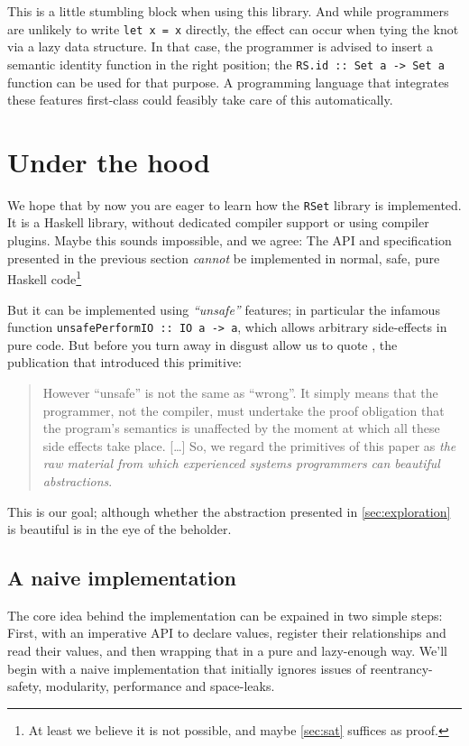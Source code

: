 \documentclass[manuscript,screen,acmsmall]{acmart}
\begin{document}
This is a little stumbling block when using this library. And while programmers are unlikely to write \verb|let x = x| directly, the effect can occur when tying the knot via a lazy data structure. In that case, the programmer is advised to insert a semantic identity function in the right position; the \verb|RS.id :: Set a -> Set a| function can be used for that purpose.
A programming language that integrates these features first-class could feasibly take care of this automatically.

\section{Under the hood}\label{sec:impl}

We hope that by now you are eager to learn how the \verb|RSet| library is implemented. It is a Haskell library, without dedicated compiler support or using compiler plugins. Maybe this sounds impossible, and we agree: The API and specification presented in the previous section \emph{cannot} be implemented in normal, safe, pure Haskell code\footnote{At least we believe it is not possible, and maybe \cref{sec:sat} suffices as proof.}

But it can be implemented using \emph{“unsafe”} features; in particular the infamous function \verb|unsafePerformIO :: IO a -> a|, which allows arbitrary side-effects in pure code. But before you turn away in disgust allow us to quote \citet{unsafePerformIO}, the publication that introduced this primitive:
\begin{quote}
However “unsafe” is not the same as “wrong”. It simply means that the programmer, not the compiler, must undertake the proof obligation that the program's semantics is unaffected by the moment at which all these side effects take place. [\ldots]
So, we regard the primitives of this paper as \emph{the raw material from which experienced systems programmers can beautiful abstractions}.
\end{quote}
This is our goal; although whether the abstraction presented in \cref{sec:exploration} is beautiful is in the eye of the beholder.

\subsection{A naive implementation}

The core idea behind the implementation can be expained in two simple steps: First, with an imperative API to declare values, register their relationships and read their values, and then wrapping that in a pure and lazy-enough way. We’ll begin with a naive implementation that initially ignores issues of reentrancy-safety, modularity, performance and space-leaks.
\end{document}
